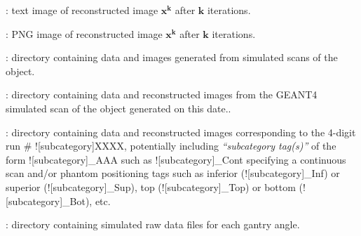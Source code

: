 \begin{tcbenvironment}
\begin{tcbparagraph}
\begin{ThinEnum}
\begin{ThinEnum}
\begin{ThinEnum}
\begin{ThinEnum}
\begin{ThinEnum}
\begin{ThinEnum}
\begin{ThinEnum}
\begin{ThinEnum}
\begin{ThinEnum}
\begin{ThinEnum}
\begin{ThinEnum}
                                                    \item {} : text image of reconstructed image $\boldsymbol{x^k}$ after $\boldsymbol{k}$ iterations.
                                                    \item {} : PNG image of reconstructed image $\boldsymbol{x^k}$ after $\boldsymbol{k}$ iterations.
                                                \end{ThinEnum}%
                                        \end{ThinEnum}%
                                    \end{ThinEnum}%
                                \end{ThinEnum}%
                            \end{ThinEnum}%
                        \end{ThinEnum}%
                    \end{ThinEnum}%
                \end{ThinEnum}%
            \end{ThinEnum}%
            \item {} : directory containing data and images generated from simulated scans of the object.
            \begin{ThinEnum}
                	\item {} : directory containing data and reconstructed images from the GEANT4 simulated scan of the object generated on this date..
			\begin{ThinEnum}
				\item {} : directory containing data and reconstructed images corresponding to the 4-digit run \# \docentry![subcategory]{XXXX}, potentially including \emph{``subcategory tag(s)''} of the form \docentry![subcategory]{\_AAA} such as  \docentry![subcategory]{\_Cont} specifying a continuous scan and/or phantom positioning tags such as inferior (\docentry![subcategory]{\_Inf}) or superior (\docentry![subcategory]{\_Sup}), top (\docentry![subcategory]{\_Top}) or bottom (\docentry![subcategory]{\_Bot}), etc.
                    \begin{ThinEnum}
                        \item {} : directory containing simulated raw data files for each gantry angle.

\end{ThinEnum}
\end{ThinEnum}
\end{ThinEnum}
\end{ThinEnum}
\end{ThinEnum}
\end{tcbparagraph}
\end{tcbenvironment}
